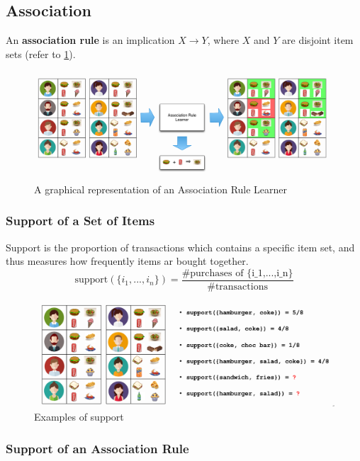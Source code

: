 \documentclass[11pt]{article}
\begin{document}
\subsection{Association}

An \textbf{association rule} is an implication $X\rightarrow Y$, where $X$ and $Y$ are disjoint item sets (refer to \ref{fig:associationrule}).

\begin{figure}[htb!]
    \centering
    \includegraphics[keepaspectratio, width=0.7\linewidth]{Pictures/association_rule}
    \caption{A graphical representation of an Association Rule Learner}
    \label{fig:associationrule}
\end{figure}

\subsubsection{Support of a Set of Items}

Support is the proportion of transactions which contains a specific item set, and thus measures how frequently items ar bought together.
\begin{equation*}
    \text{support}(\{i_1,...,i_n\}) = \frac{\#\text{purchases of \{i_1,...,i_n\}}}{\# \text{transactions}}
\end{equation*}

\begin{figure}[htb!]
    \centering
    \includegraphics[width=0.7\linewidth, keepaspectratio]{Pictures/support_example}
    \caption{Examples of support}
    \label{fig:supportexample}
\end{figure}

\subsubsection{Support of an Association Rule}
\end{document}
